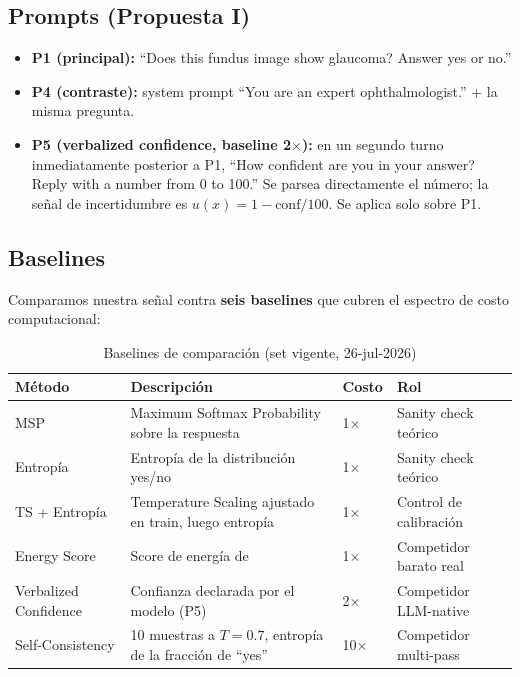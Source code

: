\documentclass[12pt,a4paper]{article}
\begin{document}
\subsection{Prompts (Propuesta I)}

\begin{itemize}[leftmargin=2em]
    \item \textbf{P1 (principal):} ``Does this fundus image show glaucoma? Answer yes or no.''

    \item \textbf{P4 (contraste):} system prompt ``You are an expert ophthalmologist.'' + la misma pregunta.

    \item \textbf{P5 (verbalized confidence, baseline 2$\times$):} en un segundo turno inmediatamente posterior a P1, ``How confident are you in your answer? Reply with a number from 0 to 100.''
    Se parsea directamente el número; la señal de incertidumbre es $u(x) = 1 - \text{conf}/100$.
    Se aplica solo sobre P1.
\end{itemize}

\subsection{Baselines}
\label{sec:baselines}

Comparamos nuestra señal contra \textbf{seis baselines} que cubren el espectro de costo computacional:

\begin{table}[H]
\centering
\caption{Baselines de comparación (set vigente, 26-jul-2026)}
\label{tab:baselines}
\begin{tabularx}{\textwidth}{lXll}
\toprule
\textbf{Método} & \textbf{Descripción} & \textbf{Costo} & \textbf{Rol} \\
\midrule
MSP & Maximum Softmax Probability sobre la respuesta & 1$\times$ & Sanity check teórico \\
Entropía & Entropía de la distribución yes/no & 1$\times$ & Sanity check teórico \\
TS + Entropía & Temperature Scaling ajustado en train, luego entropía & 1$\times$ & Control de calibración \\
Energy Score & Score de energía de \citet{liu2020energy} & 1$\times$ & Competidor barato real \\
Verbalized Confidence & Confianza declarada por el modelo (P5) & 2$\times$ & Competidor LLM-native \\
Self-Consistency & 10 muestras a $T=0.7$, entropía de la fracción de ``yes'' & 10$\times$ & Competidor multi-pass \\
\bottomrule
\end{tabularx}
\end{table}
\end{document}
